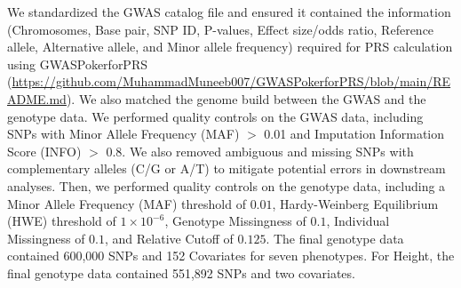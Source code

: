 \documentclass[pdflatex,sn-nature]{sn-jnl}%
\begin{document}
We standardized the GWAS catalog file and ensured it contained the information (Chromosomes, Base pair, SNP ID, P-values, Effect size/odds ratio, Reference allele, Alternative allele, and Minor allele frequency) required for PRS calculation using GWASPokerforPRS (\url{https://github.com/MuhammadMuneeb007/GWASPokerforPRS/blob/main/README.md}). We also matched the genome build between the GWAS and the genotype data. We performed quality controls on the GWAS data, including SNPs with Minor Allele Frequency (MAF) $>$ 0.01 and Imputation Information Score (INFO) $>$ 0.8. We also removed ambiguous and missing SNPs with complementary alleles (C/G or A/T) to mitigate potential errors in downstream analyses. Then, we performed quality controls on the genotype data, including a Minor Allele Frequency (MAF)  threshold of $0.01$, Hardy-Weinberg Equilibrium (HWE) threshold of $1 \times 10^{-6}$, Genotype Missingness of $0.1$, Individual Missingness of $0.1$, and Relative Cutoff of $0.125$. The final genotype data contained 600,000 SNPs and 152 Covariates for seven phenotypes. For Height, the final genotype data contained 551,892 SNPs and two covariates.
\end{document}
